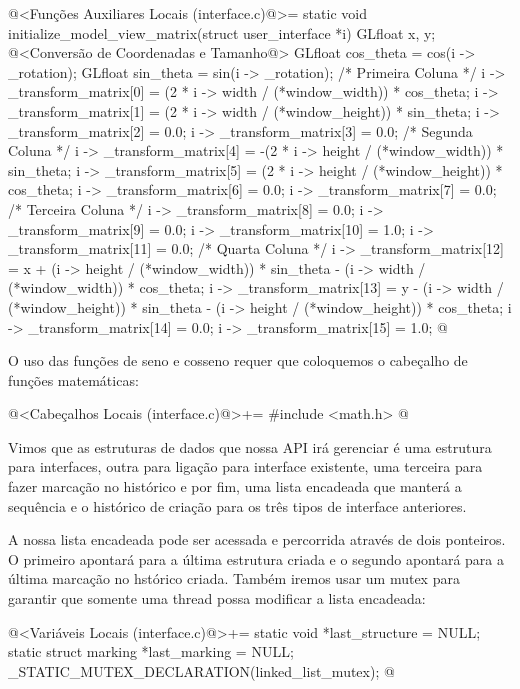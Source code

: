 \iniciocodigo
@<Funções Auxiliares Locais (interface.c)@>=
static void initialize_model_view_matrix(struct user_interface *i){
  GLfloat x, y;
  @<Conversão de Coordenadas e Tamanho@>
  GLfloat cos_theta = cos(i -> _rotation);
  GLfloat sin_theta = sin(i -> _rotation);
  /* Primeira Coluna */
  i -> _transform_matrix[0] = (2 * i -> width / (*window_width)) *
    cos_theta;
  i -> _transform_matrix[1] = (2 * i -> width / (*window_height)) *
    sin_theta;
  i -> _transform_matrix[2] = 0.0;
  i -> _transform_matrix[3] = 0.0;
  /* Segunda Coluna */
  i -> _transform_matrix[4] = -(2 * i -> height / (*window_width)) *
     sin_theta;
  i -> _transform_matrix[5] = (2 * i -> height / (*window_height)) *
    cos_theta;
  i -> _transform_matrix[6] = 0.0;
  i -> _transform_matrix[7] = 0.0;
  /* Terceira Coluna */
  i -> _transform_matrix[8] = 0.0;
  i -> _transform_matrix[9] = 0.0;
  i -> _transform_matrix[10] = 1.0;
  i -> _transform_matrix[11] = 0.0;
  /* Quarta Coluna */
  i -> _transform_matrix[12] = x +
    (i -> height / (*window_width)) * sin_theta -
    (i -> width / (*window_width)) * cos_theta;
  i -> _transform_matrix[13] = y -
    (i -> width / (*window_height)) * sin_theta -
    (i -> height / (*window_height)) * cos_theta;
  i -> _transform_matrix[14] = 0.0;
  i -> _transform_matrix[15] = 1.0;
}
@
\fimcodigo

O uso das funções de seno e cosseno requer que coloquemos o cabeçalho
de funções matemáticas:

\iniciocodigo
@<Cabeçalhos Locais (interface.c)@>+=
#include <math.h>
@
\fimcodigo


Vimos que as estruturas de dados que nossa API irá gerenciar é uma
estrutura para interfaces, outra para ligação para interface
existente, uma terceira para fazer marcação no histórico e por fim,
uma lista encadeada que manterá a sequência e o histórico de criação
para os três tipos de interface anteriores.

A nossa lista encadeada pode ser acessada e percorrida através de dois
ponteiros. O primeiro apontará para a última estrutura criada e o
segundo apontará para a última marcação no hstórico criada. Também
iremos usar um mutex para garantir que somente uma thread possa
modificar a lista encadeada:

\iniciocodigo
@<Variáveis Locais (interface.c)@>+=
static void *last_structure = NULL;
static struct marking *last_marking = NULL;
_STATIC_MUTEX_DECLARATION(linked_list_mutex);
@
\fimcodigo


